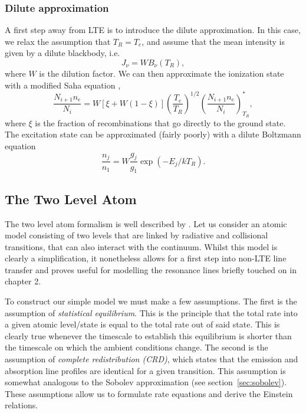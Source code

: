 \subsubsection{Dilute approximation}
\label{sec:dilute}
A first step away from LTE is to introduce the dilute approximation. In this case,
we relax the assumption that $T_R = T_e$, and assume that the mean intensity is given
by a dilute blackbody, i.e. 
\begin{equation}
J_\nu = W B_\nu (T_R),
\label{eq:dilute_jnu}
\end{equation}
where $W$ is the dilution factor. We can then approximate the ionization state
with a modified Saha equation \citep{AL85,ML93},
\begin{equation}
\frac{N_{i+1} n_e}{N_i} = W [\xi + W(1-\xi)]
\left(\frac{T_e}{T_R}\right)^{1/2}
\left(\frac{N_{i+1}n_e}{N_i}\right)^*_{T_R}, \label{eq:ml93}
\end{equation}
where $\xi$ is the fraction of recombinations that go directly to
the ground state.
The excitation state can be approximated (fairly poorly) 
with a dilute Boltzmann equation \citep{AL85,lucy1999sne}
\begin{equation}
\frac{n_{j}}{n_{1}} = W \frac{g_j}{g_{1}} \exp(-E_j/kT_R).
\label{eq:dilute_boltzmann}
\end{equation}

\subsection{The Two Level Atom}

The two level atom formalism is well described by \cite{mihalas}.
Let us consider an atomic model consisting of two levels that are linked 
by radiative and collisional transitions, that can also interact with the 
continuum. Whilst this model is clearly a simplification, it nonetheless allows
for a first step into non-LTE line transfer and proves useful for modelling
the resonance lines briefly touched on in chapter 2.

To construct our simple model we must make a few assumptions. The first
is the assumption of {\em statistical equilibrium}. This is the principle 
that the total rate into a given atomic level/state is equal to the 
total rate out of said state. This is clearly true whenever the timescale
to establish this equilibrium is shorter than the timescale on which
the ambient conditions change. The second is the assumption of
{\em complete redistribution (CRD)}, which states that the emission
and absorption line profiles are identical for a given transition. This 
assumption is somewhat analogous to the Sobolev approximation 
(see section~\ref{sec:sobolev}). 
These assumptions allow us to formulate rate equations and derive the 
Einstein relations.

